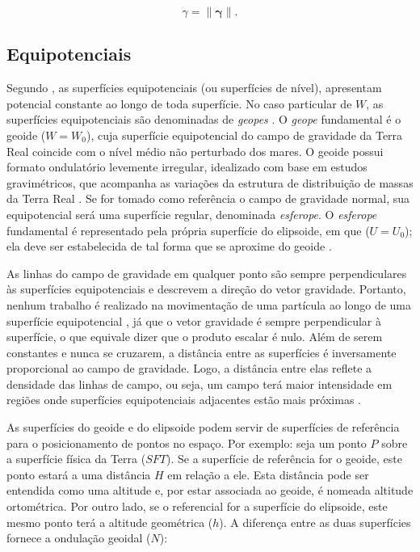 \begin{equation} \label{eq:gravidade_normal}
\displaystyle {\gamma = \parallel \boldsymbol{\gamma} \parallel }.
\end{equation}

\subsection{Equipotenciais}

Segundo , as superfícies equipotenciais (ou superfícies de nível), apresentam potencial constante ao longo de toda superfície. No caso particular de $W$, as superfícies equipotenciais são denominadas de \textit{geopes} \cite{arana2009}. O \textit{geope} fundamental é o geoide ($W = W_{0}$), cuja superfície equipotencial do campo de gravidade da Terra Real coincide com o nível médio não perturbado dos mares. O geoide possui formato ondulatório levemente irregular, idealizado com base em estudos gravimétricos, que acompanha as variações da estrutura de distribuição de massas da Terra Real \cite{matos2016}. Se for tomado como referência o campo de gravidade normal, sua equipotencial será uma superfície regular, denominada \textit{esferope}. O \textit{esferope} fundamental é representado pela própria superfície do elipsoide, em que ($U=U_0$); ela deve ser estabelecida de tal forma que se aproxime do geoide \cite{barthelmes2009}. 

As linhas do campo de gravidade em qualquer ponto são sempre perpendiculares às superfícies equipotenciais e descrevem a direção do vetor gravidade. Portanto, nenhum trabalho é realizado na movimentação de uma partícula ao longo de uma superfície equipotencial \cite{torge}, já que o vetor gravidade é sempre perpendicular à superfície, o que equivale dizer que o produto escalar é nulo. Além de serem constantes e nunca se cruzarem, a distância entre as superfícies é inversamente proporcional ao campo de gravidade. Logo, a distância entre elas reflete a densidade das linhas de campo, ou seja, um campo terá maior intensidade em regiões onde superfícies equipotenciais adjacentes estão mais próximas \cite{blakely1996}.

As superfícies do geoide e do elipsoide podem servir de superfícies de referência para o posicionamento de pontos no espaço. Por exemplo: seja um ponto $P$ sobre a superfície física da Terra ($SFT$). Se a superfície de referência for o geoide, este ponto estará a uma distância $H$ em relação a ele. Esta distância pode ser entendida como uma altitude e, por estar associada ao geoide, é nomeada altitude ortométrica. Por outro lado, se o referencial for a superfície do elipsoide, este mesmo ponto terá a altitude geométrica ($h$). A diferença entre as duas superfícies fornece a ondulação geoidal ($N$): 


